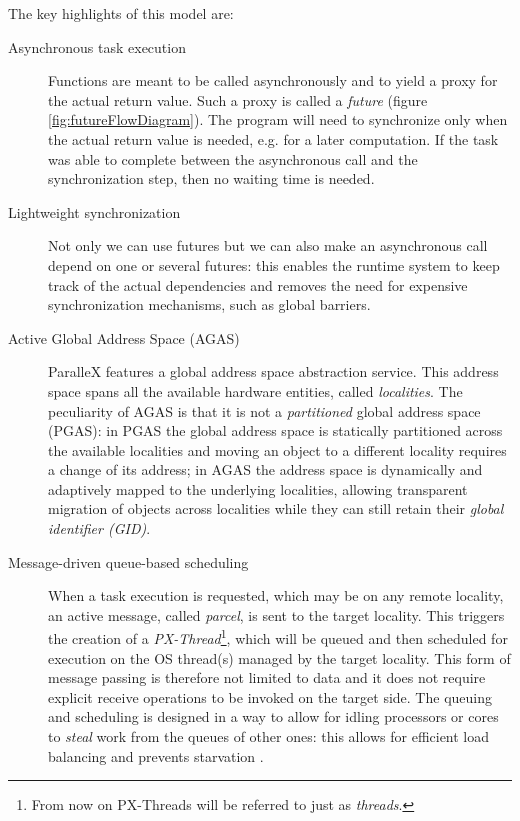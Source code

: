 The key highlights of this model are:
\begin{description}
	\item [Asynchronous task execution] Functions are meant to be called asynchronously and to yield a proxy for the actual return value. Such a proxy is called a \emph{future} (figure \ref{fig:futureFlowDiagram}). The program will need to synchronize only when the actual return value is needed, e.g. for a later computation. If the task was able to complete between the asynchronous call and the synchronization step, then no waiting time is needed.
	\item [Lightweight synchronization] Not only we can use futures but we can also make an asynchronous call depend on one or several futures: this enables the runtime system to keep track of the actual dependencies and removes the need for expensive synchronization mechanisms, such as global barriers.
	\item [Active Global Address Space (AGAS)] ParalleX features a global address space abstraction service. This address space spans all the available hardware entities, called \emph{localities}.
	The peculiarity of AGAS is that it is not a \emph{partitioned} global address space (PGAS): in PGAS the global address space is statically partitioned across the available localities and moving an object to a different locality requires a change of its address; in AGAS the address space is dynamically and adaptively mapped to the underlying localities, allowing transparent migration of objects across localities while they can still retain their \emph{global identifier (GID)}.
	\item [Message-driven queue-based scheduling] When a task execution is requested, which may be on any remote locality, an active message, called \emph{parcel}, is sent to the target locality. This triggers the creation of a \emph{PX-Thread}\footnote{From now on PX-Threads will be referred to just as \emph{threads}.}, which will be queued and then scheduled for execution on the OS thread(s) managed by the target locality. This form of message passing is therefore not limited to data and it does not require explicit receive operations to be invoked on the target side. The queuing and scheduling is designed in a way to allow for idling processors or cores to \emph{steal} work from the queues of other ones: this allows for efficient load balancing and prevents starvation
	.
\end{description}

